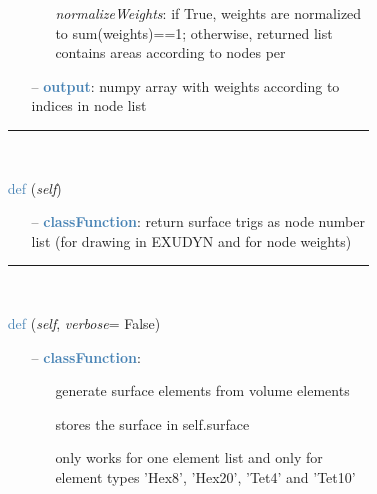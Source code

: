 \begin{itemize}[leftmargin=1.4cm]
\begin{itemize}[leftmargin=1.4cm]
\begin{itemize}[leftmargin=0.5cm]
\begin{itemize}[leftmargin=1.4cm]
\begin{itemize}[leftmargin=1.4cm]
\begin{itemize}[leftmargin=0.5cm]
\begin{itemize}[leftmargin=0.7cm]
\begin{itemize}[leftmargin=1.2cm]
\item[]{\it normalizeWeights}: if True, weights are normalized to sum(weights)==1; otherwise, returned list contains areas according to nodes per
\end{itemize}
\item[--]\textcolor{steelblue}{\bf output}: numpy array with weights according to indices in node list
\vspace{12pt}\end{itemize}
%
\noindent\rule{8cm}{0.75pt}\vspace{1pt} \\ 
\begin{flushleft}
\noindent \textcolor{steelblue}{def {\bf {}}}\label{sec:FEM:FEMinterface:GetSurfaceTriangles}
({\it self})
\end{flushleft}
\setlength{\itemindent}{0.7cm}
\begin{itemize}[leftmargin=0.7cm]
\item[--]\textcolor{steelblue}{\bf classFunction}: return surface trigs as node number list (for drawing in EXUDYN and for node weights)
\vspace{12pt}\end{itemize}
%
\noindent\rule{8cm}{0.75pt}\vspace{1pt} \\ 
\begin{flushleft}
\noindent \textcolor{steelblue}{def {\bf {}}}\label{sec:FEM:FEMinterface:VolumeToSurfaceElements}
({\it self}, {\it verbose}= False)
\end{flushleft}
\setlength{\itemindent}{0.7cm}
\begin{itemize}[leftmargin=0.7cm]
\item[--]\textcolor{steelblue}{\bf classFunction}: \vspace{-6pt}
\begin{itemize}[leftmargin=1.2cm]
\setlength{\itemindent}{-0.7cm}
\item[]generate surface elements from volume elements
\item[]stores the surface in self.surface
\item[]only works for one element list and only for element types 'Hex8', 'Hex20', 'Tet4' and 'Tet10'
\end{itemize}
\vspace{12pt}\end{itemize}

\end{itemize}
\end{itemize}
\end{itemize}
\end{itemize}
\end{itemize}
\end{itemize}
